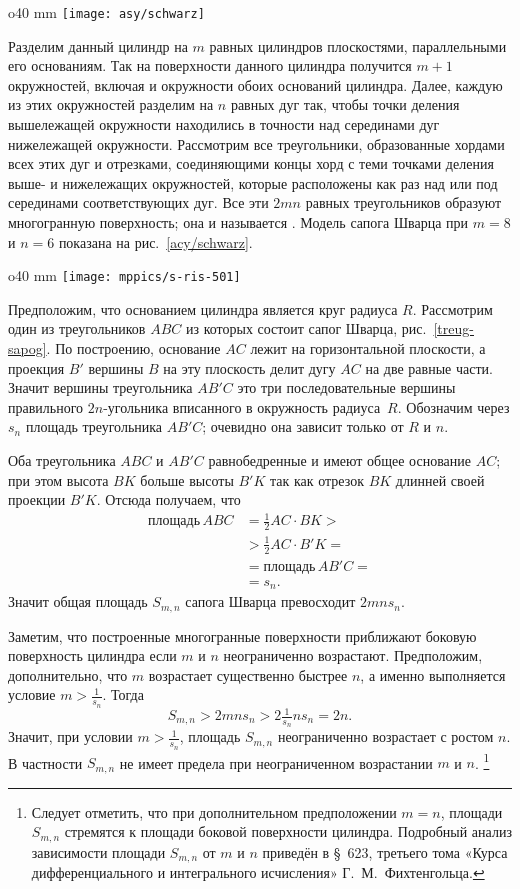 \begin{wrapfigure}{o}{40 mm}
\centering
\texttt{[image: asy/schwarz]}
\caption{}
\label{acy/schwarz}
\end{wrapfigure}

Разделим данный цилиндр на $m$ равных цилиндров плоскостями, параллельными его основаниям.
Так на поверхности данного цилиндра получится $m+1$ окружностей, включая и окружности обоих оснований цилиндра.
Далее, каждую из этих окружностей разделим на $n$ равных дуг так, чтобы точки деления вышележащей окружности находились в точности над серединами дуг нижележащей окружности.
Рассмотрим все треугольники, образованные хордами всех этих дуг и отрезками, соединяющими концы хорд с теми точками деления выше- и нижележащих окружностей, которые расположены как раз над или под серединами соответствующих дуг.
Все эти $2mn$ равных треугольников образуют многогранную поверхность; 
она и называется .
Модель сапога Шварца при $m=8$ и $n=6$ показана на рис.~\ref{acy/schwarz}.


\begin{wrapfigure}{o}{40 mm}
\centering
\texttt{[image: mppics/s-ris-501]}
\caption{}\label{treug-sapog}
\end{wrapfigure}

Предположим, что основанием цилиндра является круг радиуса $R$.
Рассмотрим один из треугольников $ABC$ из которых состоит сапог Шварца, рис.~\ref{treug-sapog}.
По построению, основание $AC$ лежит на горизонтальной плоскости,
а проекция $B'$ вершины $B$ на эту плоскость делит дугу $AC$ на две равные части.
Значит вершины треугольника $AB'C$ это три последовательные вершины правильного $2n$-угольника вписанного в окружность радиуса~$R$.
Обозначим через $s_n$ площадь треугольника $AB'C$; очевидно она зависит только от $R$ и $n$.
 
Оба треугольника $ABC$ и $AB'C$ равнобедренные и имеют общее основание $AC$;
при этом высота $BK$ больше высоты $B'K$ так как отрезок $BK$ длинней своей проекции $B'K$.
Отсюда получаем, что
\begin{align*}
\text{площадь}\, ABC&=\tfrac12 AC\cdot BK>
\\
&>\tfrac12 AC\cdot B'K=
\\
&=\text{площадь}\, AB'C=
\\
&=s_n.
\end{align*}
Значит общая площадь $S_{m,n}$ сапога Шварца превосходит $2mns_n$.

Заметим, что построенные многогранные поверхности приближают боковую поверхность цилиндра если $m$ и $n$ неограниченно возрастают.
Предположим, дополнительно, что $m$ возрастает существенно быстрее $n$,
а именно выполняется условие $m>\tfrac1{s_n}$.
Тогда
\[S_{m,n}> 2 m n s_n>2 \tfrac1{s_n} n s_n=2n.\]
Значит, при условии $m>\tfrac1{s_n}$, площадь $S_{m,n}$ неограниченно возрастает с ростом $n$.
В частности $S_{m,n}$ не имеет предела при неограниченном возрастании $m$ и $n$.%
\footnote{Следует отметить, что при дополнительном предположении $m=n$, площади $S_{m,n}$ стремятся к площади боковой поверхности цилиндра. Подробный анализ зависимости площади $S_{m,n}$ от $m$ и $n$ приведён в §~623, третьего тома  «Курса дифференциального и интегрального исчисления» Г.~М.~Фихтенгольца.}


